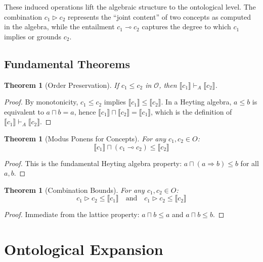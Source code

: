 \documentclass[12pt,a4paper]{article}
\newtheorem{theorem}[definition]{Theorem}
\newcommand{\onto}{\mathcal{O}}
\newcommand{\sem}[1]{\llbracket #1 \rrbracket}
\begin{document}
These induced operations lift the algebraic structure to the ontological level. The combination $c_1 \triangleright c_2$ represents the ``joint content'' of two concepts as computed in the algebra, while the entailment $c_1 \multimap c_2$ captures the degree to which $c_1$ implies or grounds $c_2$.

\subsection{Fundamental Theorems}

\begin{theorem}[Order Preservation]
If $c_1 \leq c_2$ in $\onto$, then $\sem{c_1} \vdash_A \sem{c_2}$.
\end{theorem}

\begin{proof}
By monotonicity, $c_1 \leq c_2$ implies $\sem{c_1} \leq \sem{c_2}$. In a Heyting algebra, $a \leq b$ is equivalent to $a \sqcap b = a$, hence $\sem{c_1} \sqcap \sem{c_2} = \sem{c_1}$, which is the definition of $\sem{c_1} \vdash_A \sem{c_2}$.
\end{proof}

\begin{theorem}[Modus Ponens for Concepts]
For any $c_1, c_2 \in O$:
$$
\sem{c_1} \sqcap (c_1 \multimap c_2) \leq \sem{c_2}
$$
\end{theorem}

\begin{proof}
This is the fundamental Heyting algebra property: $a \sqcap (a \Rightarrow b) \leq b$ for all $a, b$.
\end{proof}

\begin{theorem}[Combination Bounds]
For any $c_1, c_2 \in O$:
$$
c_1 \triangleright c_2 \leq \sem{c_1} \quad \text{and} \quad c_1 \triangleright c_2 \leq \sem{c_2}
$$
\end{theorem}

\begin{proof}
Immediate from the lattice property: $a \sqcap b \leq a$ and $a \sqcap b \leq b$.
\end{proof}

\section{Ontological Expansion}
\end{document}
